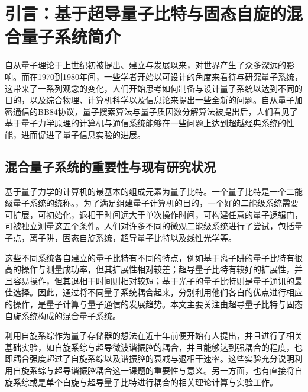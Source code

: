 \chapter{引言：基于超导量子比特与固态自旋的混合量子系统简介}
\label{cha:intro}




        自从量子理论于上世纪初被提出、建立与发展以来，对世界产生了众多深远的影响。而在1970到1980年间，一些学者开始以可设计的角度来看待与研究量子系统\cite{feynman1982simulating}，这带来了一系列观念的变化，人们开始思考如何制备与设计量子系统以达到不同的目的，以及综合物理、计算机科学以及信息论来提出一些全新的问题。\cite{nielsen2002quantum}自从量子加密通信的BB84协议\cite{bennett1984quantum}，量子搜索算法\cite{grover1996fast}与量子质因数分解算法\cite{shor1994algorithms}被提出后，人们看见了基于量子力学原理的计算机与通信系统能够在一些问题上达到超越经典系统的性能，进而促进了量子信息实验的进展。

        \section{混合量子系统的重要性与现有研究状况} %
        \label{sec:importance}

            基于量子力学的计算机的最基本的组成元素为量子比特。一个量子比特是一个二能级量子系统的统称。，为了满足组建量子计算机的目的，一个好的二能级系统需要可扩展，可初始化，退相干时间远大于单次操作时间，可构建任意的量子逻辑门，可被独立测量这五个条件\cite{divincenzo2000physical}。人们对许多不同的微观二能级系统进行了尝试，包括量子点\cite{loss1998quantum}，离子阱\cite{haffner2008quantum}，固态自旋系统\cite{gershenfeld1997bulk}，超导量子比特\cite{devoret2013superconducting}以及线性光学\cite{kok2007linear}等。

            这些不同系统各自建立的量子比特有不同的特点，例如基于离子阱的量子比特有很高的操作与测量成功率，但其扩展性相对较差；超导量子比特有较好的扩展性，并且容易操作，但其退相干时间则相对较短；基于光子的量子比特则是量子通讯的最佳选择。因此，通过将不同量子系统耦合起来，分别利用他们各自的优点进行相应的操作，是量子计算与量子通信的发展趋势。本文主要关注由超导量子比特与固态自旋系统构成的混合量子系统。


            利用自旋系综作为量子存储器的想法在近十年前便开始有人提出\cite{Dutt2007,Imamoglu2009,Wesenberg2009}，并且进行了相关基础实验，如自旋系综与超导微波谐振腔的耦合\cite{Schuster2010}，并且能够达到强耦合的程度，也即耦合强度超过了自旋系综以及谐振腔的衰减与退相干速率\cite{kubo2010}。这些实验充分说明利用自旋系综与超导谐振腔耦合这一课题的重要性与意义。另一方面，也有直接将自旋系综或是单个自旋与超导量子比特进行耦合的相关理论计算\cite{Marcos2010}与实验工作\cite{Zhu2011,Mark2013}。




